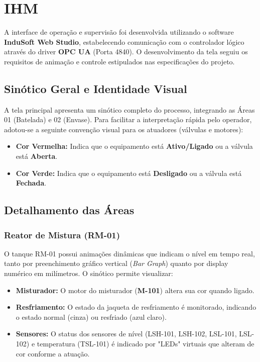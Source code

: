 \section{IHM}\label{sec:ihm}

A interface de operação e supervisão foi desenvolvida utilizando o software \textbf{InduSoft Web Studio}, estabelecendo comunicação com o controlador lógico através do driver \textbf{OPC UA} (Porta 4840). O desenvolvimento da tela seguiu os requisitos de animação e controle estipulados nas especificações do projeto.

\subsection{Sinótico Geral e Identidade Visual}
A tela principal apresenta um sinótico completo do processo, integrando as Áreas 01 (Batelada) e 02 (Envase). Para facilitar a interpretação rápida pelo operador, adotou-se a seguinte convenção visual para os atuadores (válvulas e motores):
\begin{itemize}
    \item \textbf{Cor Vermelha:} Indica que o equipamento está \textbf{Ativo/Ligado} ou a válvula está \textbf{Aberta}.
    \item \textbf{Cor Verde:} Indica que o equipamento está \textbf{Desligado} ou a válvula está \textbf{Fechada}.
\end{itemize}

\subsection{Detalhamento das Áreas}

\subsubsection{Reator de Mistura (RM-01)}
O tanque RM-01 possui animações dinâmicas que indicam o nível em tempo real, tanto por preenchimento gráfico vertical (\textit{Bar Graph}) quanto por display numérico em milímetros. O sinótico permite visualizar:
\begin{itemize}
    \item \textbf{Misturador:} O motor do misturador (\textbf{M-101}) altera sua cor quando ligado.
    \item \textbf{Resfriamento:} O estado da jaqueta de resfriamento é monitorado, indicando o estado normal (cinza) ou resfriado (azul claro).
    \item \textbf{Sensores:} O status dos sensores de nível (LSH-101, LSH-102, LSL-101, LSL-102) e temperatura (TSL-101) é indicado por "LEDs" virtuais que alteram de cor conforme a atuação.
\end{itemize}


